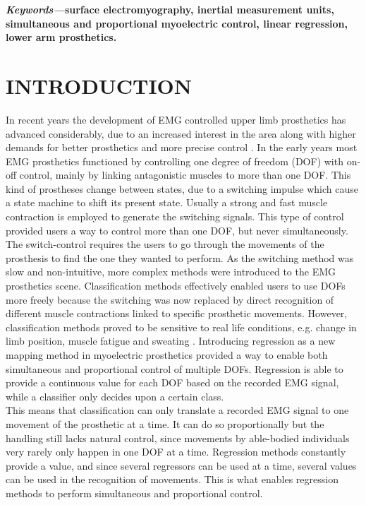 \begin{multicols}{2}
\textbf{\textit{Keywords---}surface electromyography, inertial measurement units, simultaneous and proportional myoelectric control, linear regression, lower arm prosthetics.}
	
	
\section*{INTRODUCTION}%
		
%		
In recent years the development of EMG controlled upper limb prosthetics has advanced considerably, due to an increased interest in the area along with higher demands for better prosthetics and more precise control \cite{Fougner2012}. In the early years most EMG prosthetics functioned by controlling one degree of freedom (DOF) with on-off control, mainly by linking antagonistic muscles to more than one DOF. This kind of prostheses change between states, due to a switching impulse which cause a state machine to shift its present state. Usually a strong and fast muscle contraction is employed to generate the switching signals. \cite{amsuess2014}
This type of control provided users a way to control more than one DOF, but never simultaneously. The switch-control requires the users to go through the movements of the prosthesis to find the one they wanted to perform. As the switching method was slow and non-intuitive, more complex methods were introduced to the EMG prosthetics scene. Classification methods effectively enabled users to use DOFs more freely because the switching was now replaced by direct recognition of different muscle contractions linked to specific prosthetic movements. However, classification methods proved to be sensitive to real life conditions, e.g. change in limb position, muscle fatigue and sweating \cite{Ison2016}. Introducing regression as a new mapping method in myoelectric prosthetics provided a way to enable both simultaneous and proportional control of multiple DOFs. Regression is able to provide a continuous value for each DOF based on the recorded EMG signal, while a classifier only decides upon a certain class. \cite{hahne2014, jiang2010} \\
This means that classification can only translate a recorded EMG signal to one movement of the prosthetic at a time. It can do so proportionally but the handling still lacks natural control, since movements by able-bodied individuals very rarely only happen in one DOF at a time. Regression methods constantly provide a value, and since several regressors can be used at a time, several values can be used in the recognition of movements. This is what enables regression methods to perform simultaneous and proportional control. 

\end{multicols}
